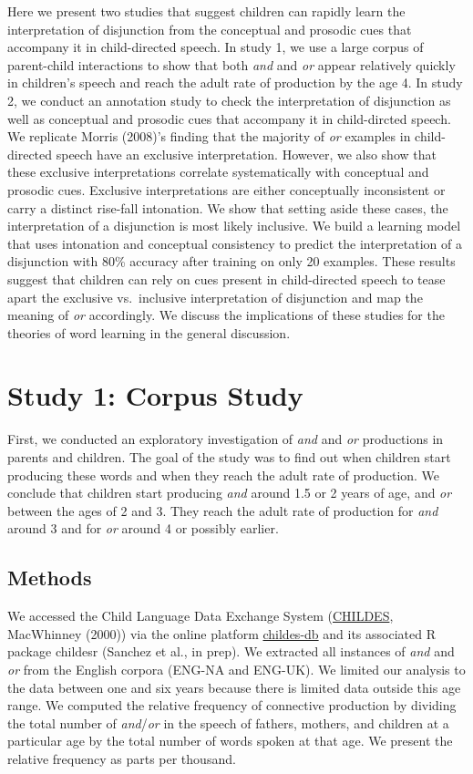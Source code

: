 \documentclass[10pt, letterpaper]{article}
\begin{document}
Here we present two studies that suggest children can rapidly learn the
interpretation of disjunction from the conceptual and prosodic cues that
accompany it in child-directed speech. In study 1, we use a large corpus
of parent-child interactions to show that both \emph{and} and \emph{or}
appear relatively quickly in children's speech and reach the adult rate
of production by the age 4. In study 2, we conduct an annotation study
to check the interpretation of disjunction as well as conceptual and
prosodic cues that accompany it in child-dircted speech. We replicate
Morris (2008)'s finding that the majority of \emph{or} examples in
child-directed speech have an exclusive interpretation. However, we also
show that these exclusive interpretations correlate systematically with
conceptual and prosodic cues. Exclusive interpretations are either
conceptually inconsistent or carry a distinct rise-fall intonation. We
show that setting aside these cases, the interpretation of a disjunction
is most likely inclusive. We build a learning model that uses intonation
and conceptual consistency to predict the interpretation of a
disjunction with 80\% accuracy after training on only 20 examples. These
results suggest that children can rely on cues present in child-directed
speech to tease apart the exclusive vs.~inclusive interpretation of
disjunction and map the meaning of \emph{or} accordingly. We discuss the
implications of these studies for the theories of word learning in the
general discussion.

\section{Study 1: Corpus Study}\label{study-1-corpus-study}

First, we conducted an exploratory investigation of \emph{and} and
\emph{or} productions in parents and children. The goal of the study was
to find out when children start producing these words and when they
reach the adult rate of production. We conclude that children start
producing \emph{and} around 1.5 or 2 years of age, and \emph{or} between
the ages of 2 and 3. They reach the adult rate of production for
\emph{and} around 3 and for \emph{or} around 4 or possibly earlier.

\subsection{Methods}\label{methods}

We accessed the Child Language Data Exchange System
(\href{https://childes.talkbank.org/}{CHILDES}, MacWhinney (2000)) via
the online platform \href{http://childes-db.stanford.edu/}{childes-db}
and its associated R package childesr (Sanchez et al., in prep). We
extracted all instances of \emph{and} and \emph{or} from the English
corpora (ENG-NA and ENG-UK). We limited our analysis to the data between
one and six years because there is limited data outside this age range.
We computed the relative frequency of connective production by dividing
the total number of \emph{and}/\emph{or} in the speech of fathers,
mothers, and children at a particular age by the total number of words
spoken at that age. We present the relative frequency as parts per
thousand.
\end{document}
